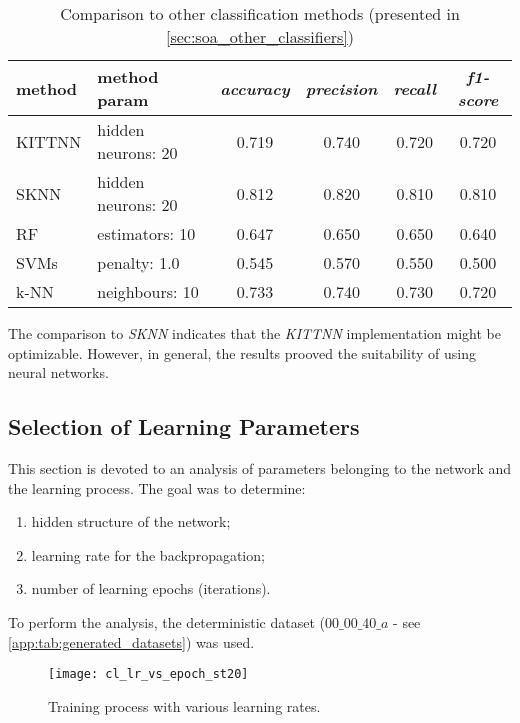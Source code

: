 \begin{table}[H]
\centering
\caption{Comparison to other classification methods (presented in \cref{sec:soa_other_classifiers})}
\label{tab:tc_comparison_to_other_classification_methods}
\begin{tabular}{|l|l|c|c|c|c|} 
\hline
method & method param & \textit{accuracy} & \textit{precision} & \textit{recall} & \textit{f1-score} \\
\hline \hline
   KITTNN 	&  hidden neurons: 20 	 &     0.719 &      0.740 &      0.720 &   0.720\\ \hline
   SKNN     &  hidden neurons: 20 	 &     0.812 &      0.820 &      0.810 &   0.810\\ \hline
   RF       &  estimators: 10		 &     0.647 &      0.650 &      0.650 &   0.640\\ \hline
   SVMs     &  penalty: 1.0			 &     0.545 &      0.570 &      0.550 &   0.500\\ \hline
   k-NN     &  neighbours: 10	 	 &     0.733 &      0.740 &      0.730 &   0.720\\ \hline
\hline
\end{tabular}
\end{table}

The comparison to \textit{SKNN} indicates that the \textit{KITTNN} implementation might be optimizable. However, in general, the results prooved the suitability of using neural networks.

\subsection{Selection of Learning Parameters} \label{ssec:selection_of_learning_parameters}
This section is devoted to an analysis of parameters belonging to the network and the learning process. The goal was to determine:

\begin{enumerate}
\item hidden structure of the network;
\item learning rate for the backpropagation;
\item number of learning epochs (iterations).
\end{enumerate}

To perform the analysis, the deterministic dataset ($ 00\_00\_40\_a $ - see \cref{app:tab:generated_datasets}) was used.

\begin{figure}[H]
  \centering
  \texttt{[image: cl\_lr\_vs\_epoch\_st20]}
  \caption{Training process with various learning rates.}
  \label{fig:lr_analysis}
\end{figure}

